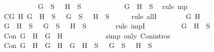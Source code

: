 \begin{isabellebody}
\ \ \ \ \ \ \ \ \isamarkupfalse%
\ {\isachardoublequoteopen}\isactrlbold {\isasymnot}\ G\ {\isasymin}\ S\ {\isasymor}\ \isactrlbold {\isasymnot}\ H\ {\isasymin}\ S{\isachardoublequoteclose}\isanewline
\ \ \ \ \ \ \ \ \ \ \isamarkupfalse%
\ {\isacartoucheopen}\isactrlbold {\isasymnot}{\isacharparenleft}G\ \isactrlbold {\isasymand}\ H{\isacharparenright}\ {\isasymin}\ S{\isacartoucheclose}\ \isamarkupfalse%
\ {\isacharparenleft}rule\ mp{\isacharparenright}\isanewline
\ \ \ \ \ \ \isamarkupfalse%
\isanewline
\ \ \ \ \isamarkupfalse%
\isanewline
\ \ \ \ \isamarkupfalse%
\ C{}{\isacharcolon}{\isachardoublequoteopen}{\isasymforall}G\ H{\isachardot}\ \isactrlbold {\isasymnot}{\isacharparenleft}G\ \isactrlbold {\isasymor}\ H{\isacharparenright}\ {\isasymin}\ S\ {\isasymlongrightarrow}\ \isactrlbold {\isasymnot}\ G\ {\isasymin}\ S\ {\isasymand}\ \isactrlbold {\isasymnot}\ H\ {\isasymin}\ S{\isachardoublequoteclose}\isanewline
\ \ \ \ \isamarkupfalse%
\ {\isacharparenleft}rule\ allI{\isacharparenright}{\isacharplus}\isanewline
\ \ \ \ \ \ \isamarkupfalse%
\ G\ H\isanewline
\ \ \ \ \ \ \isamarkupfalse%
\ {\isachardoublequoteopen}\isactrlbold {\isasymnot}{\isacharparenleft}G\ \isactrlbold {\isasymor}\ H{\isacharparenright}\ {\isasymin}\ S\ {\isasymlongrightarrow}\ \isactrlbold {\isasymnot}\ G\ {\isasymin}\ S\ {\isasymand}\ \isactrlbold {\isasymnot}\ H\ {\isasymin}\ S{\isachardoublequoteclose}\isanewline
\ \ \ \ \ \ \isamarkupfalse%
\ {\isacharparenleft}rule\ impI{\isacharparenright}\isanewline
\ \ \ \ \ \ \ \ \isamarkupfalse%
\ {\isachardoublequoteopen}\isactrlbold {\isasymnot}{\isacharparenleft}G\ \isactrlbold {\isasymor}\ H{\isacharparenright}\ {\isasymin}\ S{\isachardoublequoteclose}\isanewline
\ \ \ \ \ \ \ \ \isamarkupfalse%
\ {\isachardoublequoteopen}Con\ {\isacharparenleft}\isactrlbold {\isasymnot}{\isacharparenleft}G\ \isactrlbold {\isasymor}\ H{\isacharparenright}{\isacharparenright}\ {\isacharparenleft}\isactrlbold {\isasymnot}\ G{\isacharparenright}\ {\isacharparenleft}\isactrlbold {\isasymnot}\ H{\isacharparenright}{\isachardoublequoteclose}\isanewline
\ \ \ \ \ \ \ \ \ \ \isamarkupfalse%
\ {\isacharparenleft}simp\ only{\isacharcolon}\ Con{\isachardot}intros{\isacharparenleft}{}{\isacharparenright}{\isacharparenright}\isanewline
\ \ \ \ \ \ \ \ \isamarkupfalse%
\ {\isachardoublequoteopen}Con\ {\isacharparenleft}\isactrlbold {\isasymnot}{\isacharparenleft}G\ \isactrlbold {\isasymor}\ H{\isacharparenright}{\isacharparenright}\ {\isacharparenleft}\isactrlbold {\isasymnot}\ G{\isacharparenright}\ {\isacharparenleft}\isactrlbold {\isasymnot}\ H{\isacharparenright}\ {\isasymlongrightarrow}\ \isactrlbold {\isasymnot}{\isacharparenleft}G\ \isactrlbold {\isasymor}\ H{\isacharparenright}\ {\isasymin}\ S\ {\isasymlongrightarrow}\ \isactrlbold {\isasymnot}\ G\ {\isasymin}\ S\ {\isasymand}\ \isactrlbold {\isasymnot}\ H\ {\isasymin}\ S{\isachardoublequoteclose}\isanewline

\end{isabellebody}
